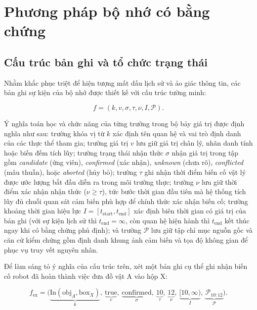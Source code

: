 \section{Phương pháp bộ nhớ có bằng chứng}

\subsection{Cấu trúc bản ghi và tổ chức trạng thái}

Nhằm khắc phục triệt để hiện tượng mất dấu lịch sử và ảo giác thông tin, các bản ghi sự kiện của bộ nhớ được thiết kế với cấu trúc tường minh:

\begin{equation}
f = (k, v, \sigma, \tau, \nu, I, \mathcal P).
\label{eq:record-tuple}
\end{equation}

Ý nghĩa toán học và chức năng của từng trường trong bộ bảy giá trị được định nghĩa như sau: trường khóa vị từ $k$ xác định tên quan hệ và vai trò định danh của các thực thể tham gia; trường giá trị $v$ lưu giữ giá trị chân lý, nhãn danh tính hoặc biến đếm tích lũy; trường trạng thái nhận thức $\sigma$ nhận giá trị trong tập gồm \textit{candidate} (ứng viên), \textit{confirmed} (xác nhận), \textit{unknown} (chưa rõ), \textit{conflicted} (mâu thuẫn), hoặc \textit{aborted} (hủy bỏ); trường $\tau$ ghi nhận thời điểm biến cố vật lý được ước lượng bắt đầu diễn ra trong môi trường thực; trường $\nu$ lưu giữ thời điểm xác nhận nhận thức ($\nu \ge \tau$), tức bước thời gian đầu tiên mà hệ thống tích lũy đủ chuỗi quan sát cảm biến phù hợp để chính thức xác nhận biến cố; trường khoảng thời gian hiệu lực $I = [t_{\mathrm{start}}, t_{\mathrm{end}}]$ xác định biên thời gian có giá trị của bản ghi (với sự kiện lịch sử thì $t_{\mathrm{end}} = \infty$, còn quan hệ hiện hành thì $t_{\mathrm{end}}$ kết thúc ngay khi có bằng chứng phủ định); và trường $\mathcal P$ lưu giữ tập chỉ mục nguồn gốc và căn cứ kiểm chứng gồm định danh khung ảnh cảm biến và tọa độ không gian để phục vụ truy vết nguyên nhân.

Để làm sáng tỏ ý nghĩa của cấu trúc trên, xét một bản ghi cụ thể ghi nhận biến cố robot đã hoàn thành việc đưa đồ vật A vào hộp X:

\begin{equation}
f_{\mathrm{ex}} = \Big(\underbrace{\text{In}(\text{obj}_A, \text{box}_X)}_{k},\ \underbrace{\text{true}}_{v},\ \underbrace{\text{confirmed}}_{\sigma},\ \underbrace{10}_{\tau},\ \underbrace{12}_{\nu},\ \underbrace{[10, \infty)}_{I},\ \underbrace{\mathcal P_{10:12}}_{\mathcal P}\Big).
\label{eq:record-example}
\end{equation}

